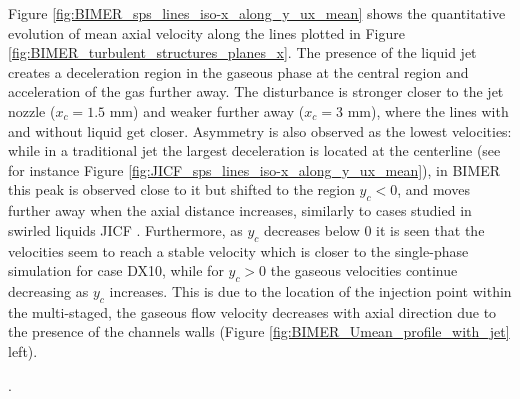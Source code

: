 Figure \ref{fig:BIMER_sps_lines_iso-x_along_y_ux_mean} shows the quantitative evolution of mean axial velocity along the lines plotted in Figure \ref{fig:BIMER_turbulent_structures_planes_x}. The presence of the liquid jet creates a deceleration region in the gaseous phase at the central region and acceleration of the gas further away. The disturbance is stronger closer to the jet nozzle ($x_c = 1.5$ mm) and weaker further away ($x_c = 3$ mm), where the lines with and without liquid get closer. Asymmetry is also observed as the lowest velocities: while in a traditional jet the largest deceleration is located at the centerline (see for instance Figure \ref{fig:JICF_sps_lines_iso-x_along_y_ux_mean}), in BIMER this peak is observed close to it but shifted to the region $y_c < 0$, and moves further away when the axial distance increases, similarly to cases studied in swirled liquids JICF . Furthermore, as $y_c$ decreases below $0$ it is seen that the velocities seem to reach a stable velocity which is closer to the single-phase simulation for case DX10, while for $y_c > 0$ the gaseous velocities continue decreasing as $y_c$ increases. This is due to the location of the injection point within the multi-staged, the gaseous flow velocity decreases with axial direction due to the presence of the channels walls (Figure \ref{fig:BIMER_Umean_profile_with_jet} left).



.



